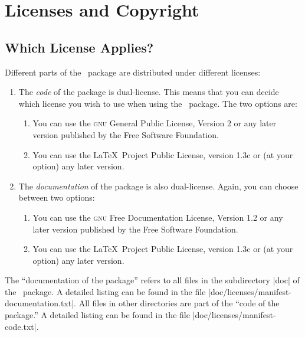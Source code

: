 %
%
%


\section{Licenses and Copyright}
\label{section-license}

\subsection{Which License Applies?}

Different parts of the \beamer\ package are distributed under different licenses:
\begin{enumerate}
\item
  The \emph{code} of the package is dual-license. This means that you can decide which license you wish to use when using the \beamer\ package. The two options are:
  \begin{enumerate}
  \item
    You can use the \textsc{gnu} General Public License, Version 2 or any later version published by the Free Software Foundation.
  \item
    You can use the \LaTeX\ Project Public License, version 1.3c or (at your option) any later version.
  \end{enumerate}
\item 
  The \emph{documentation} of the package is also dual-license. Again, you can choose between two options:
  \begin{enumerate}
  \item
    You can use the \textsc{gnu} Free Documentation License, Version 1.2 or any later version published by the Free Software Foundation.
  \item
    You can use the \LaTeX\ Project Public License, version 1.3c or (at your option) any later version.
  \end{enumerate}
\end{enumerate}

The ``documentation of the package'' refers to all files in the subdirectory |doc| of the \beamer\ package. A detailed listing can be found in the file |doc/licenses/manifest-documentation.txt|. All files in other directories are part of the ``code of the package.'' A detailed listing can be found in the file |doc/licenses/manifest-code.txt|.

